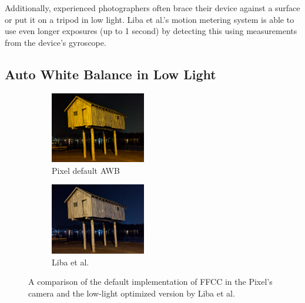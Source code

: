\documentclass{sig-alternate}
\begin{document}
Additionally, experienced photographers often brace their device against a surface or put it on a tripod in low light. Liba et al.'s motion metering system is able to use even longer exposures (up to 1 second) by detecting this using measurements from the device's gyroscope.

\subsection{Auto White Balance in Low Light}
\label{sec:autoWhiteBal}

\begin{figure}
\centering
\begin{subfigure}{9.8pc}
\centering
\includegraphics[width=9.8pc]{figures/0GMA_20180814_233948_174_qc.jpg}
\caption{Pixel default AWB}
\label{fig:whitebalance:default}
\end{subfigure}
\begin{subfigure}{9.8pc}
\centering
\includegraphics[width=9.8pc]{figures/0GMA_20180814_233948_174_gcam.jpg}
\caption{Liba et al.}
\label{fig:whitebalance:liba}
\end{subfigure}

\caption{A comparison of the default implementation of FFCC in the Pixel's camera and the low-light optimized version by Liba et al.~\cite{blog:Levoy2018}}


\label{fig:whitebalance}
\end{figure}
\end{document}
